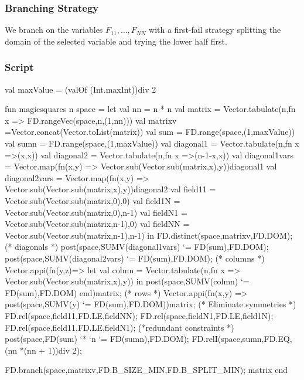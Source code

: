 \documentclass[a4paper]{scrartcl}
\begin{document}
\subsubsection{Branching Strategy}
We branch on the variables  $F_{11}, \ldots, F_{NN} $ with a first-fail 
strategy splitting the domain of the selected variable and trying 
the lower half first. 

\subsubsection{Script}
\begin{myverbatim}
val maxValue = (valOf (Int.maxInt))div 2

fun magicsquares n space =
    let
        val nn = n * n
        val matrix = Vector.tabulate(n,fn x => 
                              FD.rangeVec(space,n,(1,nn)))
        val matrixv =Vector.concat(Vector.toList(matrix))
        val sum = FD.range(space,(1,maxValue))
        val sumn = FD.range(space,(1,maxValue))
        val diagonal1 = Vector.tabulate(n,fn x =>(x,x))
        val diagonal2 = Vector.tabulate(n,fn x =>(n-1-x,x))
        val diagonal1vars = Vector.map(fn(x,y) => 
               Vector.sub(Vector.sub(matrix,x),y))diagonal1  
        val diagonal2vars = Vector.map(fn(x,y) => 
               Vector.sub(Vector.sub(matrix,x),y))diagonal2
        val field11 = Vector.sub(Vector.sub(matrix,0),0) 
        val field1N = Vector.sub(Vector.sub(matrix,0),n-1)
        val fieldN1 = Vector.sub(Vector.sub(matrix,n-1),0)
        val fieldNN = Vector.sub(Vector.sub(matrix,n-1),n-1)                 
    in
        FD.distinct(space,matrixv,FD.DOM);
        (* diagonals *)
        post(space,SUMV(diagonal1vars) `= FD(sum),FD.DOM);
        post(space,SUMV(diagonal2vars) `= FD(sum),FD.DOM);
        (* columns *)
        Vector.appi(fn(y,z)=>
         let 
            val colmn = Vector.tabulate(n,fn x =>
                         Vector.sub(Vector.sub(matrix,x),y)) 
         in
            post(space,SUMV(colmn) `= FD(sum),FD.DOM)
         end)matrix;
        (* rows *)
        Vector.appi(fn(x,y) =>
                     post(space,SUMV(y) `= FD(sum),FD.DOM))matrix;
        (* Eliminate symmetries *)
        FD.rel(space,field11,FD.LE,fieldNN);
        FD.rel(space,fieldN1,FD.LE,field1N);
        FD.rel(space,field11,FD.LE,fieldN1);
        (*redundant constraints *)
        post(space,FD(sum) `* `n `= FD(sumn),FD.DOM);
        FD.relI(space,sumn,FD.EQ,(nn *(nn + 1))div 2);
        
        FD.branch(space,matrixv,FD.B_SIZE_MIN,FD.B_SPLIT_MIN);
        {matrix}  
    end
\end{myverbatim}
\end{document}
